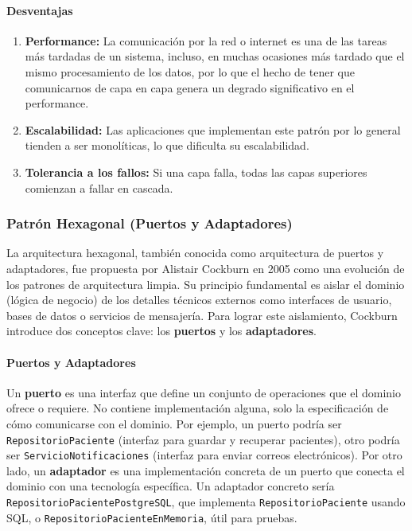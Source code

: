 \paragraph{Desventajas}
\begin{enumerate}
    \item \textbf{Performance:} La comunicación por la red o internet es una de las tareas más tardadas de un sistema, incluso, en muchas ocasiones más tardado que el mismo procesamiento de los datos, por lo que el hecho de tener que comunicarnos de capa en capa genera un degrado significativo en el performance.
    \item \textbf{Escalabilidad:} Las aplicaciones que implementan este patrón por lo general tienden a ser monolíticas, lo que dificulta su escalabilidad.
    \item \textbf{Tolerancia a los fallos:} Si una capa falla, todas las capas superiores comienzan a fallar en cascada.
\end{enumerate}

\subsubsection{Patrón Hexagonal (Puertos y Adaptadores)}

La arquitectura hexagonal, también conocida como arquitectura de puertos y adaptadores, 
fue propuesta por Alistair Cockburn en 2005 como una evolución de los patrones de arquitectura 
limpia\cite{hexagonalCockburn}. Su principio fundamental es aislar el dominio (lógica de negocio) 
de los detalles técnicos externos como interfaces de usuario, bases de datos o servicios 
de mensajería. Para lograr este aislamiento, Cockburn introduce dos conceptos clave: los 
\textbf{puertos} y los \textbf{adaptadores}.

\paragraph{Puertos y Adaptadores}
Un \textbf{puerto} es una interfaz que define un conjunto de operaciones que el dominio 
ofrece o requiere. No contiene implementación alguna, solo la especificación de cómo 
comunicarse con el dominio. Por ejemplo, un puerto podría ser \texttt{RepositorioPaciente} 
(interfaz para guardar y recuperar pacientes), otro podr\'ia ser \texttt{ServicioNotificaciones} 
(interfaz para enviar correos electrónicos). Por otro lado, un \textbf{adaptador} 
es una implementación concreta de un puerto que conecta el dominio con una tecnología 
específica. Un adaptador concreto sería \texttt{RepositorioPacientePostgreSQL}, 
que implementa \texttt{RepositorioPaciente} usando SQL, o 
\texttt{RepositorioPacienteEnMemoria}, útil para pruebas.

